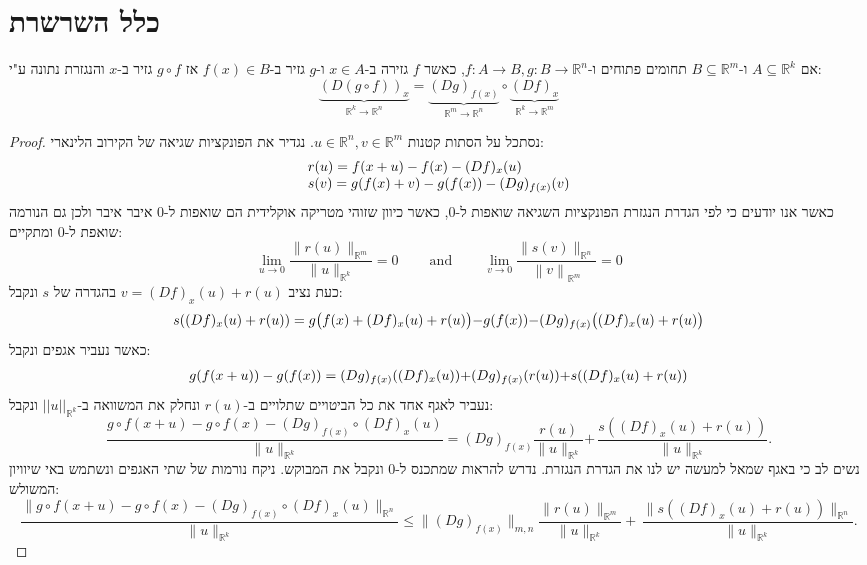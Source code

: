 \documentclass{tstextbook}
\begin{document}
\section{כלל השרשרת}

\begin{proposition}
אם \(A\subseteq \mathbb{R}^k\) ו-\(B\subseteq \mathbb{R}^m\) תחומים פתוחים ו-\(f:A\to B,g:B\to\mathbb{R}^n\), כאשר \(f\) גזירה ב-\(x \in A\) ו-\(g\) גזיר ב-\(f(x)\in B\) אז \(g\circ f\) גזיר ב-\(x\) והנגזרת נתונה ע"י:
$$\underbrace{(D(g\circ f))_{x}}_{\mathbb{R}^{k}\to\mathbb{R}^{n}}=\underbrace{(D g)_{f(x)}}_{\mathbb{R}^{m}\to\mathbb{R}^{n}}\circ\underbrace{(D f)_{x}}_{\mathbb{R}^{k}\to\mathbb{R}^{m}}$$

\end{proposition}
\begin{proof}
נסתכל על הסתות קטנות \(u\in\mathbb{R}^n,v\in\mathbb{R}^m\). נגדיר את הפונקציות שגיאה של הקירוב הלינארי:
$$\begin{array}{l c r}{{r(u)=f(x+u)-f(x)-(D f)_{x}(u)}}\\ {{s( v )=g(f(x)+ v )-g(f(x))-(D g)_{f(x)}( v )}}\end{array}$$
כאשר אנו יודעים כי לפי הגדרת הנגזרת הפונקציות השגיאה שואפות ל-0, כאשר כיוון שזוהי מטריקה אוקלידית הם שואפות ל-0 איבר איבר ולכן גם הנורמה שואפת ל-0 ומתקיים:
$$\operatorname*{lim}_{u\to0}{\frac{\|r(u)\|_{\mathbb{R}^{m}}}{\|u\|_{\mathbb{R}^{k}}}}=0\qquad{\mathrm{~and~}}\qquad\operatorname*{lim}_{ v \to0}{\frac{\|s( v )\|_{\mathbb{R}^{n}}}{\left\| v \right\|_{\mathbb{R}^{m}}}}=0$$
כעת נציב \(v=(Df)_{x}(u)+r(u)\) בהגדרה של \(s\) ונקבל:
$$\begin{array}{r l}{s((D f)_{x}(u)+r(u))=g{\big(}f(x)+(D f)_{x}(u)+r(u){\big)}} {-g(f(x))} {-(D g)_{f(x)}{\big(}(D f)_{x}(u)+r(u){\big)}}\end{array}$$
כאשר נעביר אגפים ונקבל:
$$\begin{array}{r l}{g(f(x+u))-g(f(x))=(D g)_{f(x)}((D f)_{x}(u))} {+(D g)_{f(x)}(r(u))} {+s((D f)_{x}(u)+r(u))}\end{array}$$
נעביר לאגף אחד את כל הביטויים שתלויים ב-\(r(u)\) ונחלק את המשוואה ב-\(||u||_{\mathbb{R}^k}\) ונקבל:
$${{\frac{g\circ f(x+u)-g\circ f(x)-(D g)_{f(x)}\circ(D f)_{x}(u)}{\|u\|_{\mathbb{R}^{k}}}=(D g)_{f(x)}{\frac{r(u)}{\|u\|_{\mathbb{R}^{k}}}}}} {{+\,{\frac{s((D f)_{x}(u)+r(u))}{\|u\|_{\mathbb{R}^{k}}}}.}}$$
נשים לב כי באגף שמאל למעשה יש לנו את הגדרת הנגזרת. נדרש להראות שמתכנס ל-0 ונקבל את המבוקש. ניקח נורמות של שתי האגפים ונשתמש באי שיוויון המשולש:
$${\frac{\|g\circ f(x+u)-g\circ f(x)-(D g)_{f(x)}\circ(D f)_{x}(u)\|_{\mathbb{R}^{n}}}{\|u\|_{\mathbb{R}^{k}}}}\leq\|(D g)_{f(x)}\|_{m,n}{\frac{\|r(u)\|_{\mathbb{R}^{m}}}{\|u\|_{\mathbb{R}^{k}}}}+\,{\frac{\|s((D f)_{x}(u)+r(u))\|_{\mathbb{R}^{n}}}{\|u\|_{\mathbb{R}^{k}}}}.$$

\end{proof}
\end{document}
